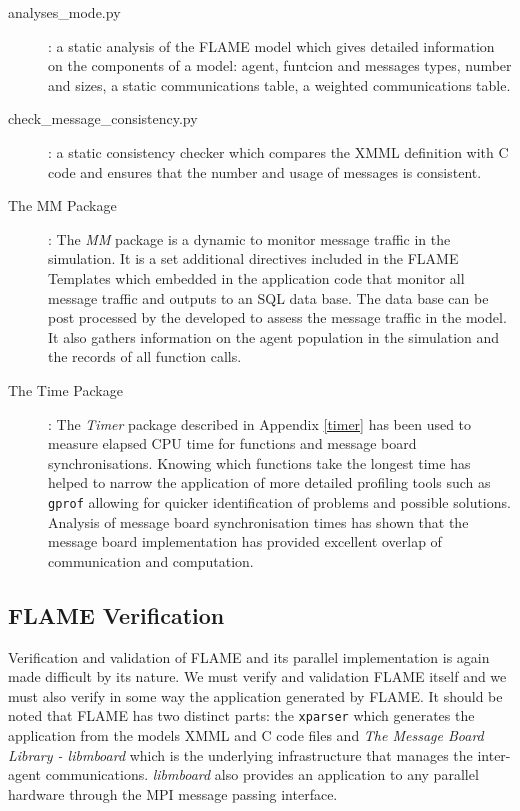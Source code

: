 \begin{description}

	\item [analyses\_mode.py]: a static analysis of the FLAME model which gives detailed information on the components of a model: agent, funtcion and messages types, number and sizes, a static communications table, a weighted communications table.

	\item [check\_message\_consistency.py]: a static consistency checker which compares the XMML definition with C code and ensures that the number and usage of messages is consistent.

	\item [The MM Package]: The \textit{MM} package is a dynamic to monitor message traffic in the simulation. It is a set additional directives included in the FLAME Templates which embedded in the application code that monitor all message traffic and outputs to an SQL data base. The data base can be post processed by the developed to assess the message traffic in the model. It also gathers information on the agent population in the simulation and the records of all function calls.

	\item [The Time Package]: The \textit{Timer} package described in Appendix \ref{timer} has been used to measure elapsed CPU time for functions and message board synchronisations. Knowing which functions take the longest time has helped to narrow the application of more detailed profiling tools such as \texttt{gprof} allowing for quicker identification of problems and possible solutions. Analysis of message board synchronisation times has shown that the message board implementation has provided excellent overlap of communication and computation.

\end{description}


\subsection {FLAME Verification}

Verification and validation of FLAME and its parallel implementation is again made difficult by its nature. We must verify and validation FLAME itself and we must also verify in some way the application generated by FLAME. It should be noted that FLAME has two distinct parts: the \texttt{xparser} which generates the application from the models XMML and C code files and \textit{The Message Board Library - libmboard} which is the underlying infrastructure that manages the inter-agent communications. \textit{libmboard} also provides an application to any parallel hardware through the MPI message passing interface.


